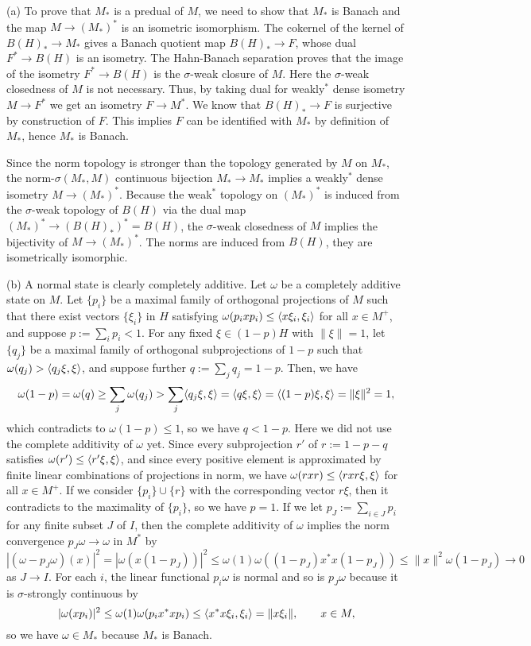 \documentclass{../../large}
\begin{document}
\begin{pf}
(a)
To prove that $M_*$ is a predual of $M$, we need to show that $M_*$ is Banach and the map $M\to(M_*)^*$ is an isometric isomorphism.
The cokernel of the kernel of $B(H)_*\to M_*$ gives a Banach quotient map $B(H)_*\to F$, whose dual $F^*\to B(H)$ is an isometry.
The Hahn-Banach separation proves that the image of the isometry $F^*\to B(H)$ is the $\sigma$-weak closure of $M$.
Here the $\sigma$-weak closedness of $M$ is not necessary.
Thus, by taking dual for weakly$^*$ dense isometry $M\to F^*$ we get an isometry $F\to M^*$.
We know that $B(H)_*\to F$ is surjective by construction of $F$.
This implies $F$ can be identified with $M_*$ by definition of $M_*$, hence $M_*$ is Banach.

Since the norm topology is stronger than the topology generated by $M$ on $M_*$, the norm-$\sigma(M_*,M)$ continuous bijection $M_*\to M_*$ implies a weakly$^*$ dense isometry $M\to(M_*)^*$.
Because the weak$^*$ topology on $(M_*)^*$ is induced from the $\sigma$-weak topology of $B(H)$ via the dual map $(M_*)^*\to(B(H)_*)^*=B(H)$, the $\sigma$-weak closedness of $M$ implies the bijectivity of $M\to(M_*)^*$.
The norms are induced from $B(H)$, they are isometrically isomorphic.






(b)
A normal state is clearly completely additive.
Let $\omega$ be a completely additive state on $M$.
Let $\{p_i\}$ be a maximal family of orthogonal projections of $M$ such that there exist vectors $\{\xi_i\}$ in $H$ satisfying $\omega(p_ixp_i)\le\langle x\xi_i,\xi_i\rangle$ for all $x\in M^+$, and suppose $p:=\sum_ip_i<1$.
For any fixed $\xi\in(1-p)H$ with $\|\xi\|=1$, let $\{q_j\}$ be a maximal family of orthogonal subprojections of $1-p$ such that $\omega(q_j)>\langle q_j\xi,\xi\rangle$, and suppose further $q:=\sum_jq_j=1-p$.
Then, we have
\[\omega(1-p)=\omega(q)\ge\sum_j\omega(q_j)>\sum_j\langle q_j\xi,\xi\rangle=\langle q\xi,\xi\rangle=\langle(1-p)\xi,\xi\rangle=\|\xi\|^2=1,\]
which contradicts to $\omega(1-p)\le1$, so we have $q<1-p$.
Here we did not use the complete additivity of $\omega$ yet.
Since every subprojection $r'$ of $r:=1-p-q$ satisfies $\omega(r')\le\langle r'\xi,\xi\rangle$, and since every positive element is approximated by finite linear combinations of projections in norm, we have $\omega(rxr)\le\langle rxr\xi,\xi\rangle$ for all $x\in M^+$.
If we consider $\{p_i\}\cup\{r\}$ with the corresponding vector $r\xi$, then it contradicts to the maximality of $\{p_i\}$, so we have $p=1$.
If we let $p_J:=\sum_{i\in J}p_i$ for any finite subset $J$ of $I$, then the complete additivity of $\omega$ implies the norm convergence $p_J\omega\to\omega$ in $M^*$ by
\[|(\omega-p_J\omega)(x)|^2=|\omega(x(1-p_J))|^2\le\omega(1)\omega((1-p_J)x^*x(1-p_J))\le\|x\|^2\omega(1-p_J)\to0\]
as $J\to I$.
For each $i$, the linear functional $p_i\omega$ is normal and so is $p_J\omega$ because it is $\sigma$-strongly continuous by
\[|\omega(xp_i)|^2\le\omega(1)\omega(p_ix^*xp_i)\le\langle x^*x\xi_i,\xi_i\rangle=\|x\xi_i\|,\qquad x\in M,\]
so we have $\omega\in M_*$ because $M_*$ is Banach.
\end{pf}
\end{document}
